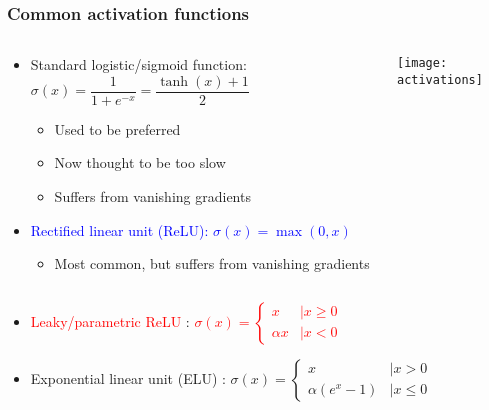 \begin{frame}
    \frametitle{Common activation functions}
    \begin{columns}
        \begin{column}{2.5in}
            \begin{itemize}
                \item \textcolor{Green4}{Standard logistic/sigmoid function: $\sigma(x) = \dfrac{1}{1 + e^{-x}} = \dfrac{\tanh(x) + 1}{2}$}
                \begin{itemize}
                    \item Used to be preferred
                    \item Now thought to be too slow
                    \item Suffers from vanishing gradients
                \end{itemize}
                \item \textcolor{blue}{Rectified linear unit (ReLU): $\sigma(x) = \max(0, x)$}
                \begin{itemize}
                    \item Most common, but suffers from vanishing gradients
                \end{itemize}
            \end{itemize}
        \end{column}
        \begin{column}{2in}
            \texttt{[image: activations]}
        \end{column}
    \end{columns}

    \begin{columns}
        \begin{column}{4.7in}
            \begin{itemize}
                \item \textcolor{red}{Leaky/parametric ReLU} \citep{MaasICML13,He15a}:
                \textcolor{red}{
                    $\sigma(x) = \begin{cases}
                        x &\mid x \ge 0 \\
                        \alpha x &| x < 0
                    \end{cases}$
                }
                \item \textcolor{Magenta3}{Exponential linear unit (ELU)} \citep{ClevertICLR16}:
                \textcolor{Magenta3}{
                    $\sigma(x) = \begin{cases}
                        x &\mid x > 0 \\
                        \alpha (e^x - 1) &\mid x \le 0
                    \end{cases}$
                }
            \end{itemize}
        \end{column}
    \end{columns}
\end{frame}

